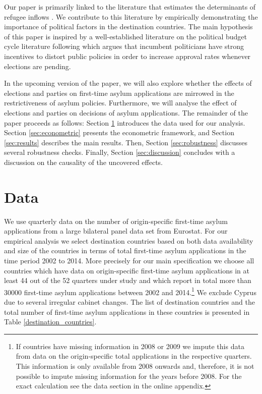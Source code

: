 \documentclass[a4paper,12pt]{article}
\begin{document}
Our paper is primarily linked to the literature that estimates the determinants of refugee inflows \citep{czaika2009, gudbrandsen2010, hatton2009, hatton2016, hatton2015,holzer2000, moore2007, neumayer2004, neumayer2005,toshkov2014}. We contribute to this literature by empirically demonstrating the importance of political factors in the destination countries. The main hypothesis of this paper is inspired by a well-established literature on the political budget cycle literature following \citet{nor75} which argues that incumbent politicians have strong incentives to distort public policies in order to increase approval rates whenever elections are pending.

In the upcoming version of the paper, we will also explore whether the effects of elections and parties on first-time asylum applications are mirrowed in the restrictiveness of asylum policies.  Furthermore, we will analyse the effect of elections and parties on decisions of asylum applications. The remainder of the paper proceeds as follows: Section \ref{sec:data} introduces the data used for our analysis. Section \ref{sec:econometric} presents the econometric framework, and Section \ref{sec:results} describes the main results. Then, Section \ref{sec:robustness} discusses several robustness checks. Finally, Section \ref{sec:discussion} concludes with a discussion on the causality of the uncovered effects.

 
\section{Data} \label{sec:data}

We use quarterly data on the number of  origin-specific first-time asylum applications from a large bilateral panel data set from Eurostat. For our empirical analysis we select destination countries based on both data availability and size of the countries in terms of total first-time asylum applications in the time period 2002 to 2014. More precisely for our main specification we choose all countries which have data on origin-specific first-time asylum applications in at least 44 out of the 52 quarters under study and which report in total more than 30000 first-time asylum applications between 2002 and 2014.\footnote{If countries have missing information in 2008 or 2009 we impute this data from data on the origin-specific total applications in the respective quarters. This information is only available from 2008 onwards and, therefore, it is not possible to impute missing information for the years before 2008. For the exact calculation see the data section in the online appendix.} We exclude Cyprus due to several irregular cabinet changes. The list of destination countries and the total number of first-time asylum applications in these countries is presented in Table \ref{destination_countries}.
\end{document}
